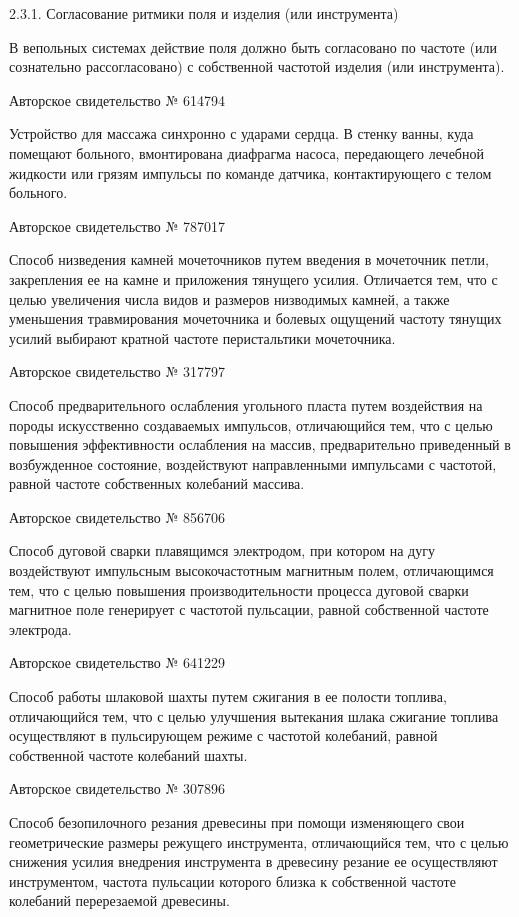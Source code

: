 2.3.1. Согласование ритмики поля и изделия (или инструмента)

В вепольных системах действие поля  должно быть согласовано по частоте
(или сознательно  рассогласовано) с собственной частотой  изделия (или
инструмента).


Авторское свидетельство № 614794

Устройство для  массажа синхронно  с ударами  сердца. В  стенку ванны,
куда  помещают больного,  вмонтирована  диафрагма насоса,  передающего
лечебной   жидкости   или   грязям  импульсы   по   команде   датчика,
контактирующего с телом больного.


Авторское свидетельство № 787017

Способ  низведения камней  мочеточников  путем  введения в  мочеточник
петли,  закрепления   ее  на  камне  и   приложения  тянущего  усилия.
Отличается  тем,  что  с  целью  увеличения  числа  видов  и  размеров
низводимых  камней, а  также  уменьшения  травмирования мочеточника  и
болевых  ощущений  частоту  тянущих усилий  выбирают  кратной  частоте
перистальтики мочеточника.


Авторское свидетельство № 317797

Способ предварительного ослабления  угольного пласта путем воздействия
на породы искусственно создаваемых  импульсов, отличающийся тем, что с
целью  повышения эффективности  ослабления  на массив,  предварительно
приведенный  в  возбужденное   состояние,  воздействуют  направленными
импульсами с частотой, равной частоте собственных колебаний массива.


Авторское свидетельство № 856706

Способ  дуговой  сварки плавящимся  электродом,  при  котором на  дугу
воздействуют импульсным высокочастотным  магнитным полем, отличающимся
тем, что с целью  повышения производительности процесса дуговой сварки
магнитное  поле генерирует  с частотой  пульсации, равной  собственной
частоте электрода.


Авторское свидетельство № 641229

Способ  работы шлаковой  шахты путем  сжигания в  ее полости  топлива,
отличающийся  тем,  что с  целью  улучшения  вытекания шлака  сжигание
топлива  осуществляют  в  пульсирующем режиме  с  частотой  колебаний,
равной собственной частоте колебаний шахты.


Авторское свидетельство № 307896

Способ  безопилочного резания  древесины при  помощи изменяющего  свои
геометрические размеры  режущего инструмента, отличающийся тем,  что с
целью  снижения  усилия  внедрения  инструмента  в  древесину  резание
ее  осуществляют инструментом,  частота  пульсации  которого близка  к
собственной частоте колебаний перерезаемой древесины.


